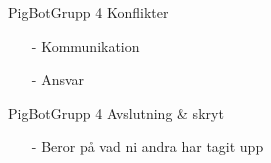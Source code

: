 \begin{frame}[fragile]{PigBot}{Grupp 4}
Konflikter
  \begin{itemize}
 \pause
    \item[-] Kommunikation
\pause
    \item[-] Ansvar
  \end{itemize}
\end{frame}

\begin{frame}[fragile]{PigBot}{Grupp 4}
Avslutning \& skryt
  \begin{itemize}
 \pause
    \item[-] Beror på vad ni andra har tagit upp
  \end{itemize}
\end{frame}


